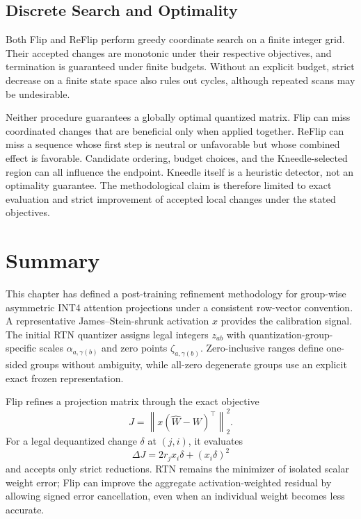 \subsection{Discrete Search and Optimality}

Both Flip and ReFlip perform greedy coordinate search on a finite integer grid. Their accepted changes are monotonic under their respective objectives, and termination is guaranteed under finite budgets. Without an explicit budget, strict decrease on a finite state space also rules out cycles, although repeated scans may be undesirable.

Neither procedure guarantees a globally optimal quantized matrix. Flip can miss coordinated changes that are beneficial only when applied together. ReFlip can miss a sequence whose first step is neutral or unfavorable but whose combined effect is favorable. Candidate ordering, budget choices, and the Kneedle-selected region can all influence the endpoint. Kneedle itself is a heuristic detector, not an optimality guarantee. The methodological claim is therefore limited to exact evaluation and strict improvement of accepted local changes under the stated objectives.

\section{Summary}

This chapter has defined a post-training refinement methodology for group-wise asymmetric INT4 attention projections under a consistent row-vector convention. A representative James--Stein-shrunk activation $x$ provides the calibration signal. The initial RTN quantizer assigns legal integers $z_{ab}$ with quantization-group-specific scales $\alpha_{a,\gamma(b)}$ and zero points $\zeta_{a,\gamma(b)}$. Zero-inclusive ranges define one-sided groups without ambiguity, while all-zero degenerate groups use an explicit exact frozen representation.

Flip refines a projection matrix through the exact objective
\begin{equation}
J=\left\|x(\hat W-W)^\top\right\|_2^2.
\end{equation}
For a legal dequantized change $\delta$ at $(j,i)$, it evaluates
\begin{equation}
\Delta J=2r_jx_i\delta+(x_i\delta)^2
\end{equation}
and accepts only strict reductions. RTN remains the minimizer of isolated scalar weight error; Flip can improve the aggregate activation-weighted residual by allowing signed error cancellation, even when an individual weight becomes less accurate.

